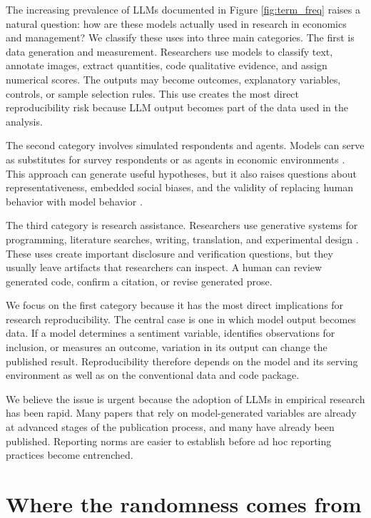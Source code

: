 \documentclass[11pt]{article}
\begin{document}
The increasing prevalence of LLMs documented in Figure \ref{fig:term_freq} raises a natural question: how are these models actually used in research in economics and management? We classify these uses into three main categories. The first is data generation and measurement. Researchers use models to classify text, annotate images, extract quantities, code qualitative evidence, and assign numerical scores. The outputs may become outcomes, explanatory variables, controls, or sample selection rules. This use creates the most direct reproducibility risk because LLM output becomes part of the data used in the analysis.\medskip

The second category involves simulated respondents and agents. Models can serve as substitutes for survey respondents or as agents in economic environments \citep{horton2023}. This approach can generate useful hypotheses, but it also raises questions about representativeness, embedded social biases, and the validity of replacing human behavior with model behavior \citep{bail2024}.\medskip

The third category is research assistance. Researchers use generative systems for programming, literature searches, writing, translation, and experimental design \citep{charness2023,korinek2023,korinek2025}. These uses create important disclosure and verification questions, but they usually leave artifacts that researchers can inspect. A human can review generated code, confirm a citation, or revise generated prose.\medskip

We focus on the first category because it has the most direct implications for research reproducibility. The central case is one in which model output becomes data. If a model determines a sentiment variable, identifies observations for inclusion, or measures an outcome, variation in its output can change the published result. Reproducibility therefore depends on the model and its serving environment as well as on the conventional data and code package.\medskip

We believe the issue is urgent because the adoption of LLMs in empirical research has been rapid. Many papers that rely on model-generated variables are already at advanced stages of the publication process, and many have already been published. Reporting norms are easier to establish before ad hoc reporting practices become entrenched.

\section{Where the randomness comes from}
\label{sec:randomness}
\end{document}
